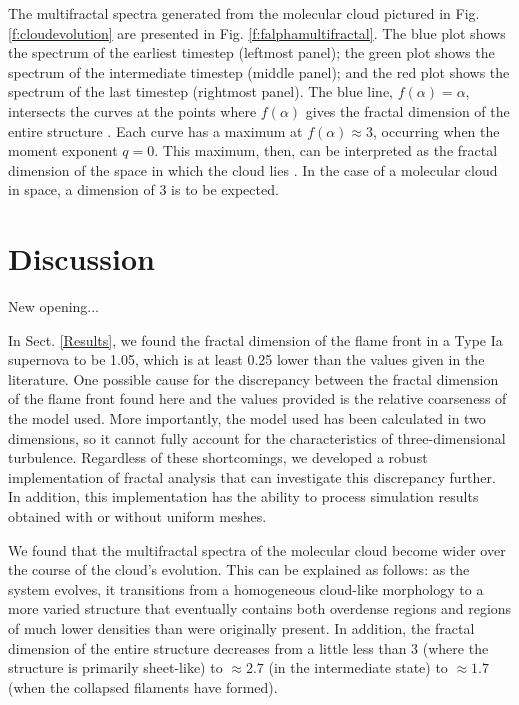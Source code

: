 \documentclass[iop]{emulateapj}
\begin{document}
The multifractal spectra generated from the molecular cloud pictured in Fig. \ref{f:cloudevolution} are presented in Fig. \ref{f:falphamultifractal}. The blue plot shows the spectrum of the earliest timestep (leftmost panel); the green plot shows the spectrum of the intermediate timestep (middle panel); and the red plot shows the spectrum of the last timestep (rightmost panel). The blue line, $f(\alpha) = \alpha $, intersects the curves at the points where $f(\alpha)$ gives the fractal dimension of the entire structure \citep{mandelbrotmultifractal}. Each curve has a maximum at $f(\alpha) \approx 3$, occurring when the moment exponent $q = 0$. This maximum, then, can be interpreted as the fractal dimension of the space in which the cloud lies \citep{Schroeder}. In the case of a molecular cloud in space, a dimension of 3 is to be expected. 

\section{Discussion}\label{Discussion}
New opening...

In Sect. \ref{Results}, we found the fractal dimension of the flame front in a Type Ia supernova to be 1.05, which is at least 0.25 lower than the values given in the literature. One possible cause for the discrepancy between the fractal dimension of the flame front found here and the values provided is the relative coarseness of the model used. More importantly, the model used has been calculated in two dimensions, so it cannot fully account for the characteristics of three-dimensional turbulence. Regardless of these shortcomings, we developed a robust implementation of fractal analysis that can investigate this discrepancy further. In addition, this implementation has the ability to process simulation results obtained with or without uniform meshes.
 
We found that the multifractal spectra of the molecular cloud become wider over the course of the cloud's evolution. This can be explained as follows: as the system evolves, it transitions from a homogeneous cloud-like morphology to a more varied structure that eventually contains both overdense regions and regions of much lower densities than were originally present. In addition, the fractal dimension of the entire structure decreases from a little less than 3 (where the structure is primarily sheet-like) to $\approx 2.7$ (in the intermediate state) to $\approx 1.7$ (when the collapsed filaments have formed).
\end{document}
